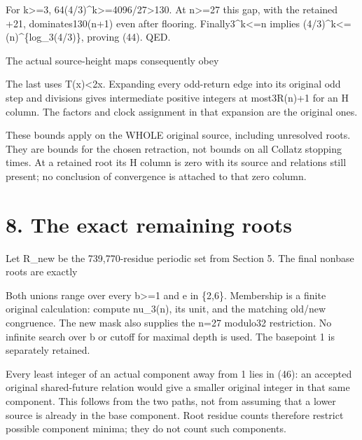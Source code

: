 For k\textgreater=3, 64(4/3)\^{}k\textgreater=4096/27\textgreater130. At
n\textgreater=27 this gap, with the retained +21, dominates130(n+1) even
after flooring. Finally3\^{}k\textless=n implies
(4/3)\^{}k\textless=(n)\^{}\{log\_3(4/3)\}, proving (44). QED.

The actual source-height maps consequently obey


The last uses T(x)\textless2x. Expanding every odd-return edge into its
original odd step and divisions gives intermediate positive integers at
most3R(n)+1 for an H column. The factors and clock assignment in that
expansion are the original ones.

These bounds apply on the WHOLE original source, including unresolved
roots. They are bounds for the chosen retraction, not bounds on all
Collatz stopping times. At a retained root its H column is zero with its
source and relations still present; no conclusion of convergence is
attached to that zero column.

\section{8. The exact remaining roots}

Let R\_new be the 739,770-residue periodic set from Section 5. The final
nonbase roots are exactly


Both unions range over every b\textgreater=1 and e in \{2,6\}.
Membership is a finite original calculation: compute nu\_3(n), its unit,
and the matching old/new congruence. The new mask also supplies the n=27
modulo32 restriction. No infinite search over b or cutoff for maximal
depth is used. The basepoint 1 is separately retained.

Every least integer of an actual component away from 1 lies in (46): an
accepted original shared-future relation would give a smaller original
integer in that same component. This follows from the two paths, not
from assuming that a lower source is already in the base component. Root
residue counts therefore restrict possible component minima; they do not
count such components.


